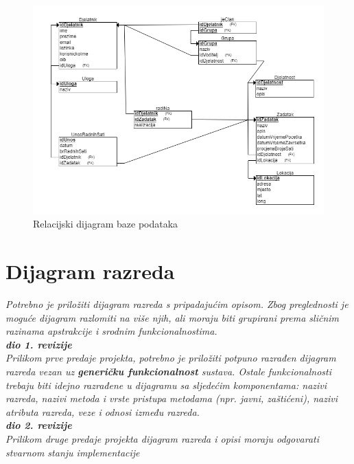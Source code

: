 				\begin{figure}
					\centering
					\includegraphics[width=\textwidth]{slike/RelDijagram.png}
					\caption{Relacijski dijagram baze podataka}
				\end{figure}		
			\eject
			
			
		\section{Dijagram razreda}
		
			\textit{Potrebno je priložiti dijagram razreda s pripadajućim opisom. Zbog preglednosti je moguće dijagram razlomiti na više njih, ali moraju biti grupirani prema sličnim razinama apstrakcije i srodnim funkcionalnostima.}\\
			
			\textbf{\textit{dio 1. revizije}}\\
			
			\textit{Prilikom prve predaje projekta, potrebno je priložiti potpuno razrađen dijagram razreda vezan uz \textbf{generičku funkcionalnost} sustava. Ostale funkcionalnosti trebaju biti idejno razrađene u dijagramu sa sljedećim komponentama: nazivi razreda, nazivi metoda i vrste pristupa metodama (npr. javni, zaštićeni), nazivi atributa razreda, veze i odnosi između razreda.}\\
			
			\textbf{\textit{dio 2. revizije}}\\			
			
			\textit{Prilikom druge predaje projekta dijagram razreda i opisi moraju odgovarati stvarnom stanju implementacije}
			
